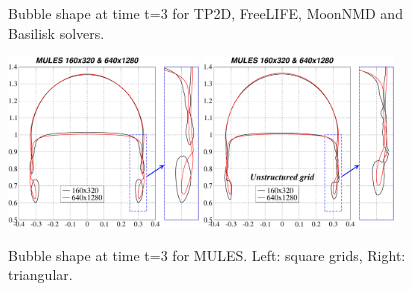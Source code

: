 \documentclass[review]{elsarticle}
\begin{document}
\begin{figure}[!h]
\begin{center}
 \vspace{-6mm}
\end{center}
\caption{Bubble shape at time t=3 for TP2D, FreeLIFE, MoonNMD and Basilisk solvers.}
\label{fig:HB_bubble_shape_3_others}
\end{figure}


\begin{figure}[!h]
\begin{center}
 \includegraphics[width=0.45\textwidth]{figures/bubble_shape_t=3_MULES-struct.pdf}
 \hspace{2mm}
 \includegraphics[width=0.45\textwidth]{figures/bubble_shape_t=3_MULES-uns.pdf}
 \vspace{-6mm}
\end{center}
\caption{Bubble shape at time t=3 for MULES. Left: square grids, Right: triangular.}
\label{fig:HB_bubble_shape_3_MULES}
\end{figure}
\end{document}
